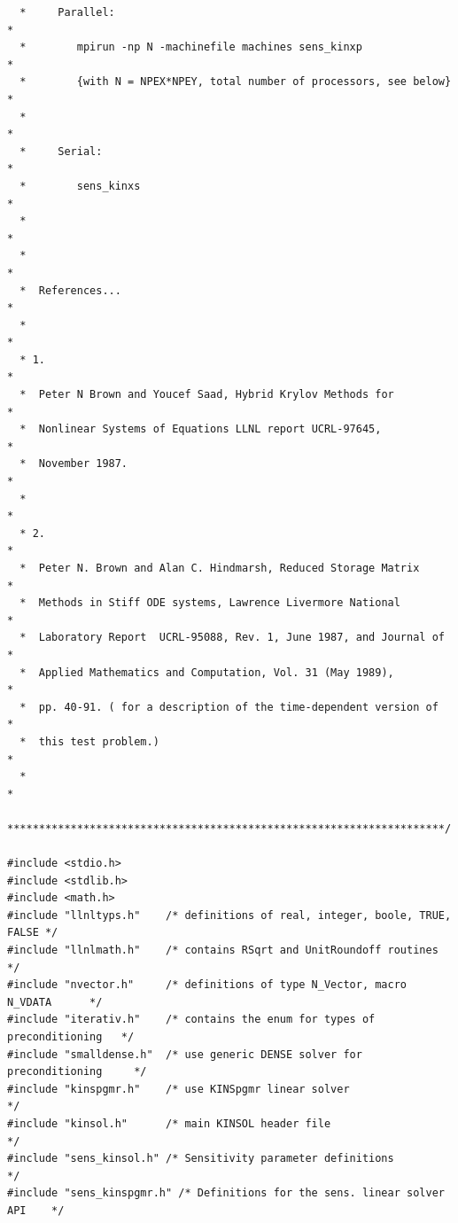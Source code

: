 \documentclass[11pt]{article}
\begin{document}
\begin{verbatim}
  *     Parallel:                                                      *
  *        mpirun -np N -machinefile machines sens_kinxp               *
  *        {with N = NPEX*NPEY, total number of processors, see below} *
  *                                                                    *
  *     Serial:                                                        *
  *        sens_kinxs                                                  *
  *                                                                    *
  *                                                                    *
  *  References...                                                     *
  *                                                                    *
  * 1.                                                                 *
  *  Peter N Brown and Youcef Saad, Hybrid Krylov Methods for          *
  *  Nonlinear Systems of Equations LLNL report UCRL-97645,            *
  *  November 1987.                                                    *
  *                                                                    *
  * 2.                                                                 *
  *  Peter N. Brown and Alan C. Hindmarsh, Reduced Storage Matrix      *
  *  Methods in Stiff ODE systems, Lawrence Livermore National         *
  *  Laboratory Report  UCRL-95088, Rev. 1, June 1987, and Journal of  *
  *  Applied Mathematics and Computation, Vol. 31 (May 1989),          *
  *  pp. 40-91. ( for a description of the time-dependent version of   *
  *  this test problem.)                                               *
  *                                                                    *
  *********************************************************************/

#include <stdio.h>
#include <stdlib.h>
#include <math.h>
#include "llnltyps.h"    /* definitions of real, integer, boole, TRUE, FALSE */
#include "llnlmath.h"    /* contains RSqrt and UnitRoundoff routines         */
#include "nvector.h"     /* definitions of type N_Vector, macro N_VDATA      */
#include "iterativ.h"    /* contains the enum for types of preconditioning   */
#include "smalldense.h"  /* use generic DENSE solver for preconditioning     */
#include "kinspgmr.h"    /* use KINSpgmr linear solver                       */
#include "kinsol.h"      /* main KINSOL header file                          */
#include "sens_kinsol.h" /* Sensitivity parameter definitions                */
#include "sens_kinspgmr.h" /* Definitions for the sens. linear solver API    */


\end{verbatim}
\end{document}
